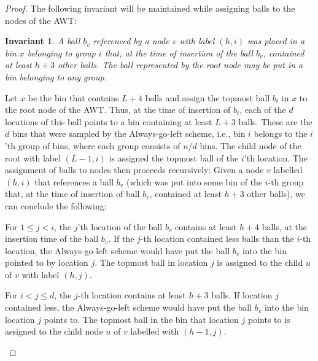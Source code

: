 \documentclass[a4paper,12pt]{article}
\newtheorem{invariant}{Invariant}
\begin{document}
\begin{proof}
The following invariant will be maintained while assigning balls to the nodes of the AWT:
\begin{invariant}
A ball $b_v$ referenced by a node $v$ with label $(h,i)$ was placed in a bin $x$ belonging to group $i$ that, at the time of insertion of the ball $b_v$, contained at least $h+3$ other balls. The ball represented by the root node may be put in a bin belonging to any group.
\end{invariant}
\noindent
Let $x$ be the bin that contains $L+4$ balls and assign the topmost ball $b_t$ in $x$ to the root node of the AWT. Thus, at the time of insertion of $b_t$, each of the $d$ locations of this ball points to a bin containing at least $L+3$ balls. These are the $d$ bins that were sampled by the Always-go-left scheme, i.e., bin $i$ belongs to the $i$'th group of bins, where each group consists of $n/d$ bins. The child node of the root with label $(L-1, i)$ is assigned the topmost ball of the $i$'th location. The assignment of balls to nodes then proceeds recursively: Given a node $v$ labelled $(h, i)$ that references a ball $b_v$ (which was put into some bin of the $i$-th group that, at the time of insertion of ball $b_v$, contained at least $h+3$ other balls), we can conclude the following:
\begin{compactitem}
\item For $1\leq j < i$, the $j$'th location of the ball $b_v$ contains at least $h+4$ balls, at the insertion time of the ball $b_v$. If the $j$-th location contained less balls than the $i$-th location, the Always-go-left scheme would have put the ball $b_v$ into the bin pointed to by location $j$. The topmost ball in location $j$ is assigned to the  child $u$ of $v$ with label $(h,j)$. 
\item For $i < j \leq d$, the $j$-th location contains at least $h+3$ balls. If location $j$ contained less, the Always-go-left scheme would have put the ball $b_v$ into the bin location $j$ points to. The topmost ball in the bin that location $j$ points to is assigned to the child node $u$ of $v$ labelled with $(h-1, j)$.

\begin{comment}
Note: The paper claims that the locations $j$ point to bins with $h+2$ balls. This can not be true, since the topmost, i.e., the $h+2$-th ball - call it $b_t$ - gets assigned to a node with label $(h'=h-1, j)$. Since there are $h+1=h'+2$ balls below it, at the time of the placement of ball $b_t$, the bin $j$ it gets put into has only $h'+2$ balls in it, violating the invariant. Same with the case $j<i$.
\end{comment}
\end{compactitem}
\end{proof}
\end{document}

